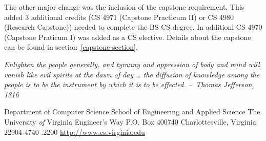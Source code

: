 \documentclass[10pt,letter]{book}
\begin{document}
The other major change was the inclusion of the capstone requirement.
This added 3 additional credits (CS 4971 (Capstone Practicum II) or CS
4980 (Research Capstone)) needed to complete the BS CS degree.  In
additionl CS 4970 (Capstone Praticum I) was added as a CS elective.
Details about the capstone can be found in
section~\ref{capstone-section}.



\cleardoublepage
\pagestyle{empty}

\vspace*{2in}

\begin{center}
\parbox{2.5in}{{\em Enlighten the people generally, and tyranny and
    oppression of body and mind will vanish like evil spirits at the
    dawn of day … the diffusion of knowledge among the people is to be
    the instrument by which it is to be effected.\linebreak\linebreak
    --~Thomas Jefferson, 1816}}
\end{center}


\clearpage

\vspace*{2.75in}

\begin{center}
Department of Computer Science \linebreak
School of Engineering and Applied Science \linebreak
The University {\em of} Virginia  Engineer's Way \linebreak
P.O. Box 400740 \linebreak
Charlottesville, Virginia 22904-4740 .2200 \linebreak
\url{http://www.cs.virginia.edu} \linebreak
\end{center}

\begin{figure}[h!]
\begin{center}
\end{center}
\end{figure}
\end{document}
